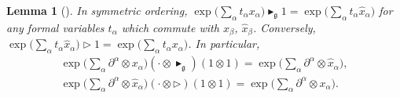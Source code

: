 \documentclass[pdftex]{sigma}
\def\gg{\mathfrak{g}}
\def\hx{\hat{x}}
\newtheorem{Lemma}[Theorem]{Lemma}
\numberwithin{equation}{section}
\begin{document}
\begin{Lemma}[\cite{scopr}]\label{lem:exp}
In symmetric ordering, $\exp\big(\sum_\alpha t_\alpha x_\alpha\big)\blacktriangleright_\gg 1 = \exp\big(\sum_\alpha t_\alpha\hx_\alpha\big)$ for any formal variables $t_\alpha$ which commute with $x_\beta$, $\hx_\beta$. Conversely, $\exp\big(\sum_\alpha t_\alpha\hx_\alpha\big)\triangleright 1 = \exp\big(\sum_\alpha t_\alpha x_\alpha\big)$. In particular,
\begin{gather}%
\exp\bigg(\sum_\alpha \partial^\alpha\otimes x_\alpha\bigg)(\cdot \otimes\blacktriangleright_\gg) (1\otimes 1) =
\exp\bigg(\sum_\alpha \partial^\alpha\otimes \hat{x}_\alpha\bigg),\nonumber\\
\label{eq:exp2exp}
\exp\bigg(\sum_\alpha \partial^\alpha\otimes \hat{x}_\alpha\bigg)
(\cdot \otimes\triangleright) (1\otimes 1) =\exp\bigg(\sum_\alpha \partial^\alpha\otimes x_\alpha\bigg).
\end{gather}
\end{Lemma}
\end{document}
